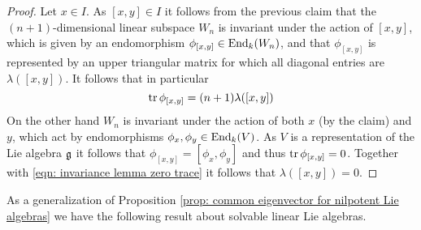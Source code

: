 \begin{proof}
 Let $x \in I$. As $[x,y] \in I$ it follows from the previous claim that the $(n+1)$-dimensional linear subspace $W_n$ is invariant under the action of $[x,y]$, which is given by an endomorphism $\phi_{[x,y]} \in \operatorname{End}_k(W_n)$, and that $\phi_{[x,y]}$ is represented by an upper triangular matrix for which all diagonal entries are $\lambda([x,y])$. It follows that in particular
 \begin{equation}\label{eqn: invariance lemma zero trace}
  \operatorname{tr} \phi_{[x,y]} = (n+1) \lambda([x,y])
 \end{equation}
 On the other hand $W_n$ is invariant under the action of both $x$ (by the claim) and $y$, which act by endomorphisms $\phi_x, \phi_y \in \operatorname{End}_k(V)$. As $V$ is a representation of the Lie algebra $\mathfrak{g}$ it follows that $\phi_{[x,y]} = [\phi_x, \phi_y]$ and thus $\operatorname{tr} \phi_{[x,y]} = 0$. Together with \eqref{eqn: invariance lemma zero trace} it follows that $\lambda([x,y]) = 0$.
\end{proof}


As a generalization of Proposition \ref{prop: common eigenvector for nilpotent Lie algebras} we have the following result about solvable linear Lie algebras.


